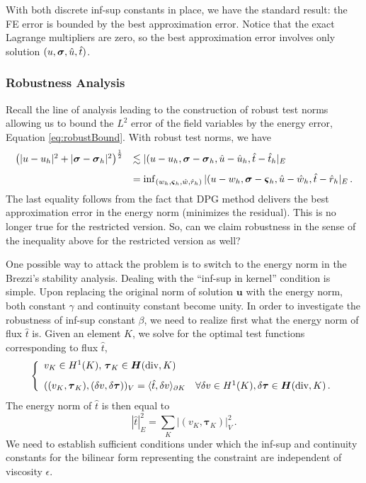 \documentclass[letterpaper]{article}
\def\bftau{\boldsymbol\tau}
\def\bfvarsigma{\boldsymbol\varsigma}
\newcommand{\LRp}[1]{\left( #1 \right)}
\newcommand{\ptl}{{\partial}}
\newcommand{\bfsig}{\mbox{\boldmath $\sigma$}}
\newcommand{\bfu}{\boldsymbol u}
\newcommand{\bfH}{\mbox{\boldmath $H$}}
\begin{document}
With both discrete inf-sup constants in place, we have the standard result: the FE error
is bounded by the best approximation error. Notice that the exact Lagrange multipliers
are zero, so the best approximation error involves only solution $(u,\bfsig,\hat{u},\hat{t})$.


\subsubsection{Robustness Analysis}

Recall the line of analysis leading to the construction of robust
test norms allowing us to bound the $L^2$ error of the field variables by the
energy error, Equation \ref{eq:robustBound}. With robust test norms, we have
\begin{equation}
\begin{array}{ll}
   \LRp{| u - u_h |^2+ | \bfsig - \bfsig_h
   |^2}^{\frac{1}{2}}
& \lesssim | (u - u_h, \bfsig - \bfsig_h, \hat{u} - \hat{u}_h, \hat{t} - \hat{t}_h |_E \\[8pt]
&= \inf_{(w_h,\bfvarsigma_h,\hat{w},\hat{r}_h)}
| (u - w_h, \bfsig - \bfvarsigma_h, \hat{u} - \hat{w}_h, \hat{t} - \hat{r}_h |_E\,.
\end{array}
\end{equation}
The last equality follows from the fact that DPG method delivers the best approximation
error in the energy norm (minimizes the residual). This is no longer true for the
restricted version. So, can we claim robustness in the sense of the inequality above
for the restricted version as well?

One possible way to attack the problem is to switch to the energy norm in the Brezzi's stability
analysis. Dealing with the ``inf-sup in kernel'' condition is simple. Upon replacing
the original norm of solution $\bfu$ with the energy norm, both constant $\gamma$ and continuity
constant become unity. In order to investigate the robustness of inf-sup  constant $\beta$,
we need to realize first what the energy norm of flux $\hat{t}$ is. Given an element $K$,
we solve for the optimal test functions corresponding to flux $\hat{t}$,
\begin{equation}
\left\{
\begin{array}{ll}
v_K \in H^1(K),\, \bftau_K \in \bfH(\text{div},K)\\[8pt]
((v_K,\bftau_K), (\delta v,\delta \bftau))_V = \langle \hat{t},\delta v\rangle_{\ptl K}
\quad \forall \delta v \in H^1(K), \delta \bftau \in \bfH(\text{div},K)\,.
\end{array}
\right.
\label{eq:local_problem}
\end{equation}
The energy norm of $\hat{t}$ is then equal to
\begin{equation}
| \hat{t} |_E^2 = \sum_K | (v_K,\bftau_K) |_V^2\,.
\end{equation}
We need to establish sufficient conditions under which the inf-sup and continuity constants for
the bilinear form representing the constraint are independent of viscosity $\epsilon$.
\end{document}
